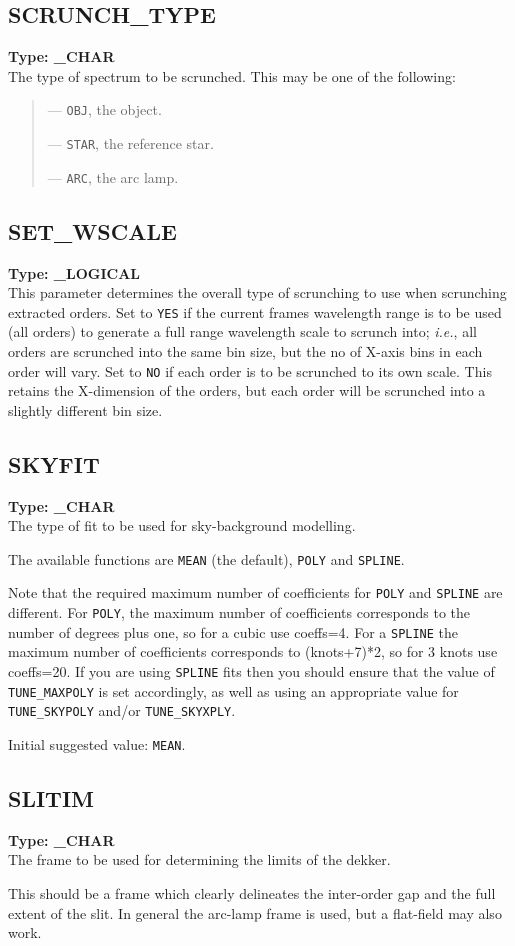 \documentclass[11pt,twoside]{article}
\makeatletter
\newcommand{\stardocinitials}  {SUN}
\newcommand{\stardocnumber}    {152.4}
\newcommand{\stardocname}{\stardocinitials /\stardocnumber}
\newcommand{\htmlref}[2]{#1}
\newcommand{\xlabel}[1]{}
\newcommand{\indexcmdname}[1]{\index{#1@\protect\cmdname{#1}}}
\renewcommand{\indexcmdname}[1]{}
\newcommand{\cmdname}{\begingroup \catcode`\_=12 \realcmdname}
\newcommand{\realcmdname}[1]{\endgroup\texttt{#1}}
\newcommand{\echparameter}[4]
{
\item [#1 = #3] \mbox{}\label{par_#2}\indexcmdname{#2}
\\
#4
}
\renewcommand{\echparameter}[4]
{
  \subsection{\xlabel{par_#2}\label{par_#2}{\bf #1}}
  {\bf Type: #3}\\
#4
}
\makeatother
\begin{document}
\markboth{PARAMETERS: S}{\stardocname}
\echparameter{SCRUNCH\_TYPE}{SCRUNCH_TYPE}{
 \_CHAR
}{
 The type of spectrum to be scrunched.  This may be one of the
 following:

 \begin{quote}
   --- {\tt OBJ}, the object.

   --- {\tt STAR}, the reference star.

   --- {\tt ARC}, the arc lamp.
 \end{quote}
}

\echparameter{SET\_WSCALE}{SET_WSCALE}{
 \_LOGICAL
}{
 This parameter determines the overall type of scrunching to use when
 scrunching extracted orders.  Set to \texttt{YES} if the current frames
 wavelength range is to be used (all orders) to generate a full range
 wavelength scale to scrunch into; {\it{i.e.}}, all orders are scrunched
 into the same bin size, but the no of X-axis bins in each order will
 vary.  Set to \texttt{NO} if each order is to be scrunched to its own scale.
 This retains the X-dimension of the orders, but each order will be
 scrunched into a slightly different bin size.
}

\echparameter{SKYFIT}{SKYFIT}{
 \_CHAR
}{
 The type of fit to be used for sky-background modelling.

 The available functions are \texttt{MEAN} (the default),
 \texttt{POLY} and \texttt{SPLINE}.

 Note that the required maximum number of coefficients for \texttt{POLY} and
 \texttt{SPLINE} are different.  For \texttt{POLY}, the maximum number of
 coefficients
 corresponds to the number of degrees plus one, so for a cubic use
 coeffs=4.  For a \texttt{SPLINE} the maximum number of coefficients corresponds
 to (knots+7)*2, so for 3 knots use coeffs=20.  If you are using \texttt{SPLINE}
 fits then you should ensure that the value of
 \htmlref{{\tt TUNE\_MAXPOLY}}{par_TUNE_MAXPOLY}
 is set accordingly, as well as using an appropriate value
 for \htmlref{{\tt TUNE\_SKYPOLY}}{par_TUNE_SKYPOLY}
 and/or \htmlref{{\tt TUNE\_SKYXPLY}}{par_TUNE_SKYXPLY}.

 Initial suggested value: \texttt{MEAN}.
}

\echparameter{SLITIM}{SLITIM}{
 \_CHAR
}{
 The frame to be used for determining the limits of the dekker.

 This should be a frame which clearly delineates the inter-order gap
 and the full extent of the slit.  In general the arc-lamp frame is
 used, but a flat-field may also work.
}
\end{document}
